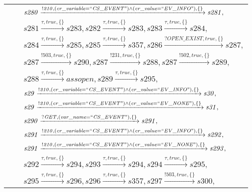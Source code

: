 \begin{tabular}{lcp{350px}}
& & $\mathit{s280}\xrightarrow{\mathit{!210}, \mathit{(cr\_variable = ``CS\_EVENT") \land (cr\_value = ``EV\_INFO")}, \{\}}\mathit{s281},$ \\
& & $\mathit{s281}\xrightarrow{\mathit{\tau}, \mathit{true}, \{\}}\mathit{s283},\mathit{s282}\xrightarrow{\mathit{\tau}, \mathit{true}, \{\}}\mathit{s283},\mathit{s283}\xrightarrow{\mathit{\tau}, \mathit{true}, \{\}}\mathit{s284},$ \\
& & $\mathit{s284}\xrightarrow{\mathit{\tau}, \mathit{true}, \{\}}\mathit{s285},\mathit{s285}\xrightarrow{\mathit{\tau}, \mathit{true}, \{\}}\mathit{s357},\mathit{s286}\xrightarrow{\mathit{?OPEN\_EXIST}, \mathit{true}, \{\}}\mathit{s287},$ \\
& & $\mathit{s287}\xrightarrow{\mathit{!503}, \mathit{true}, \{\}}\mathit{s290},\mathit{s287}\xrightarrow{\mathit{!231}, \mathit{true}, \{\}}\mathit{s288},\mathit{s287}\xrightarrow{\mathit{!502}, \mathit{true}, \{\}}\mathit{s289},$ \\
& & $\mathit{s288}\xrightarrow{\mathit{\tau}, \mathit{true}, \{\}}\mathit{assopen},\mathit{s289}\xrightarrow{\mathit{\tau}, \mathit{true}, \{\}}\mathit{s295},$ \\
& & $\mathit{s29}\xrightarrow{\mathit{!210}, \mathit{(cr\_variable = ``CS\_EVENT") \land (cr\_value = ``EV\_INFO")}, \{\}}\mathit{s30},$ \\
& & $\mathit{s29}\xrightarrow{\mathit{!210}, \mathit{(cr\_variable = ``CS\_EVENT") \land (cr\_value = ``EV\_NONE")}, \{\}}\mathit{s31},$ \\
& & $\mathit{s290}\xrightarrow{\mathit{?GET}, \mathit{(var\_name = ``CS\_EVENT")}, \{\}}\mathit{s291},$ \\
& & $\mathit{s291}\xrightarrow{\mathit{!210}, \mathit{(cr\_variable = ``CS\_EVENT") \land (cr\_value = ``EV\_INFO")}, \{\}}\mathit{s292},$ \\
& & $\mathit{s291}\xrightarrow{\mathit{!210}, \mathit{(cr\_variable = ``CS\_EVENT") \land (cr\_value = ``EV\_NONE")}, \{\}}\mathit{s293},$ \\
& & $\mathit{s292}\xrightarrow{\mathit{\tau}, \mathit{true}, \{\}}\mathit{s294},\mathit{s293}\xrightarrow{\mathit{\tau}, \mathit{true}, \{\}}\mathit{s294},\mathit{s294}\xrightarrow{\mathit{\tau}, \mathit{true}, \{\}}\mathit{s295},$ \\
& & $\mathit{s295}\xrightarrow{\mathit{\tau}, \mathit{true}, \{\}}\mathit{s296},\mathit{s296}\xrightarrow{\mathit{\tau}, \mathit{true}, \{\}}\mathit{s357},\mathit{s297}\xrightarrow{\mathit{!503}, \mathit{true}, \{\}}\mathit{s300},$ \\

\end{tabular}
